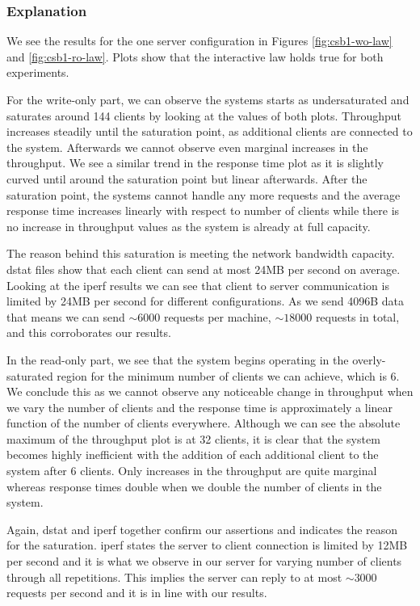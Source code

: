 \documentclass[11pt,a4paper]{article}
\begin{document}
\subsubsection{Explanation} \label{sec:csb1-exp}
We see the results for the one server configuration in Figures \ref{fig:csb1-wo-law} and \ref{fig:csb1-ro-law}. Plots show that the interactive law holds true for both experiments.

\par For the write-only part, we can observe the systems starts as undersaturated and saturates around 144 clients by looking at the values of both plots. Throughput increases steadily until the saturation point, as additional clients are connected to the system. Afterwards we cannot observe even marginal increases in the throughput. We see a similar trend in the response time plot as it is slightly curved until around the saturation point but linear afterwards. After the saturation point, the systems cannot handle any more requests and the average response time increases linearly with respect to number of clients while there is no increase in throughput values as the system is already at full capacity.
\par The reason behind this saturation is meeting the network bandwidth capacity. dstat files show that each client can send at most 24MB per second on average. Looking at the iperf results we can see that client to server communication is limited by 24MB per second for different configurations. As we send 4096B data that means we can send $\sim 6000$ requests per machine, $\sim 18000$ requests in total, and this corroborates our results.

\par In the read-only part, we see that the system begins operating in the overly-saturated region for the minimum number of clients we can achieve, which is 6. We conclude this as we cannot observe any noticeable change in throughput when we vary the number of clients and the response time is approximately a linear function of the number of clients everywhere. Although we can see the absolute maximum of the throughput plot is at 32 clients, it is clear that the system becomes highly inefficient with the addition of each additional client to the system after 6 clients. Only increases in the throughput are quite marginal whereas response times double when we double the number of clients in the system.
\par Again, dstat and iperf together confirm our assertions and indicates the reason for the saturation. iperf states the server to client connection is limited by 12MB per second and it is what we observe in our server for varying number of clients through all repetitions. This implies the server can reply to at most $\sim 3000$ requests per second and it is in line with our results.
\end{document}
